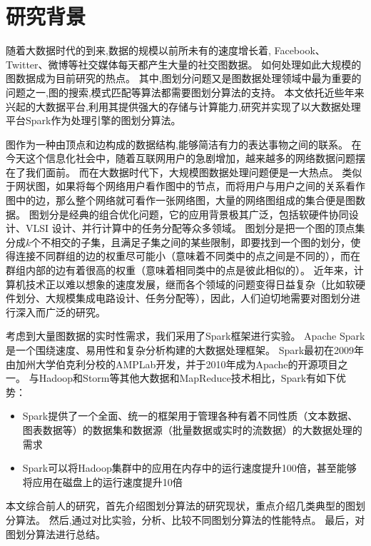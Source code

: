 \section{研究背景}

随着大数据时代的到来,数据的规模以前所未有的速度增长着, Facebook、Twitter、微博等社交媒体每天都产生大量的社交图数据。
如何处理如此大规模的图数据成为目前研究的热点。
其中,图划分问题又是图数据处理领域中最为重要的问题之一,图的搜索,模式匹配等算法都需要图划分算法的支持。
本文依托近些年来兴起的大数据平台,利用其提供强大的存储与计算能力,研究并实现了以大数据处理平台Spark作为处理引擎的图划分算法。

图作为一种由顶点和边构成的数据结构,能够简洁有力的表达事物之间的联系。
在今天这个信息化社会中，随着互联网用户的急剧增加，越来越多的网络数据问题摆在了我们面前。
而在大数据时代下，大规模图数据处理问题便是一大热点。
类似于网状图，如果将每个网络用户看作图中的节点，而将用户与用户之间的关系看作图中的边，那么整个网络就可看作一张网络图，大量的网络图组成的集合便是图数据。
图划分是经典的组合优化问题，它的应用背景极其广泛，包括软硬件协同设计、VLSI 设计、并行计算中的任务分配等众多领域。
图划分是把一个图的顶点集分成$k$个不相交的子集，且满足子集之间的某些限制，即要找到一个图的划分，使得连接不同群组的边的权重尽可能小（意味着不同类中的点之间是不同的），而在群组内部的边有着很高的权重（意味着相同类中的点是彼此相似的）。
近年来，计算机技术正以难以想象的速度发展，继而各个领域的问题变得日益复杂（比如软硬件划分、大规模集成电路设计、任务分配等），因此，人们迫切地需要对图划分进行深入而广泛的研究。

考虑到大量图数据的实时性需求，我们采用了Spark框架进行实验。
Apache Spark是一个围绕速度、易用性和复杂分析构建的大数据处理框架。
Spark最初在2009年由加州大学伯克利分校的AMPLab开发，并于2010年成为Apache的开源项目之一。
与Hadoop和Storm等其他大数据和MapReduce技术相比，Spark有如下优势：

\begin{itemize}
    \item Spark提供了一个全面、统一的框架用于管理各种有着不同性质（文本数据、图表数据等）的数据集和数据源（批量数据或实时的流数据）的大数据处理的需求
    \item Spark可以将Hadoop集群中的应用在内存中的运行速度提升100倍，甚至能够将应用在磁盘上的运行速度提升10倍
\end{itemize}

本文综合前人的研究，首先介绍图划分算法的研究现状，重点介绍几类典型的图划分算法。
然后,通过对比实验，分析、比较不同图划分算法的性能特点。
最后，对图划分算法进行总结。
